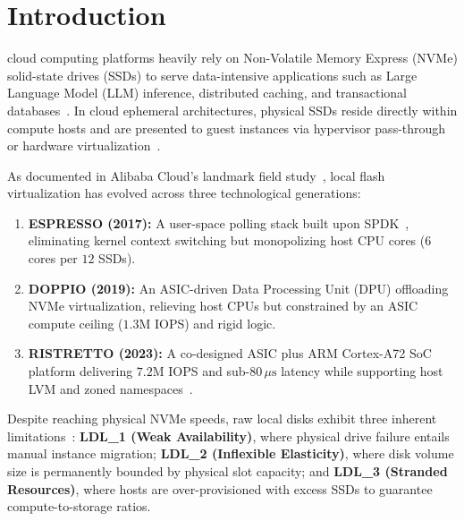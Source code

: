 \documentclass[lettersize,journal]{IEEEtran}
\begin{document}
\section{Introduction}
 cloud computing platforms heavily rely on Non-Volatile Memory Express (NVMe) solid-state drives (SSDs) to serve data-intensive applications such as Large Language Model (LLM) inference, distributed caching, and transactional databases~\cite{yang2026here, zhang2024ebs}. In cloud ephemeral architectures, physical SSDs reside directly within compute hosts and are presented to guest instances via hypervisor pass-through or hardware virtualization~\cite{bjorling2021zns, spdk2025}.

As documented in Alibaba Cloud's landmark field study~\cite{yang2026here}, local flash virtualization has evolved across three technological generations:
\begin{enumerate}
    \item \textbf{ESPRESSO (2017):} A user-space polling stack built upon SPDK~\cite{spdk2025}, eliminating kernel context switching but monopolizing host CPU cores ($6$ cores per $12$ SSDs).
    \item \textbf{DOPPIO (2019):} An ASIC-driven Data Processing Unit (DPU) offloading NVMe virtualization, relieving host CPUs but constrained by an ASIC compute ceiling ($1.3$M IOPS) and rigid logic.
    \item \textbf{RISTRETTO (2023):} A co-designed ASIC plus ARM Cortex-A72 SoC platform delivering $7.2$M IOPS and sub-$80\,\mu\text{s}$ latency while supporting host LVM and zoned namespaces~\cite{bjorling2021zns}.
\end{enumerate}

Despite reaching physical NVMe speeds, raw local disks exhibit three inherent limitations~\cite{yang2026here}: \textbf{LDL\_1 (Weak Availability)}, where physical drive failure entails manual instance migration; \textbf{LDL\_2 (Inflexible Elasticity)}, where disk volume size is permanently bounded by physical slot capacity; and \textbf{LDL\_3 (Stranded Resources)}, where hosts are over-provisioned with excess SSDs to guarantee compute-to-storage ratios.
\end{document}
